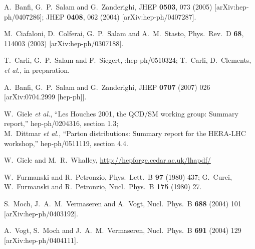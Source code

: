 \documentclass[12pt]{article}
\begin{document}
\begin{thebibliography}{99}
  A.~Banfi, G.~P.~Salam and G.~Zanderighi,
  JHEP {\bf 0503}, 073 (2005)
  [arXiv:hep-ph/0407286];
%
  JHEP {\bf 0408}, 062 (2004)
  [arXiv:hep-ph/0407287].

  M.~Ciafaloni, D.~Colferai, G.~P.~Salam and A.~M.~Stasto,
  Phys.\ Rev.\  D {\bf 68}, 114003 (2003)
  [arXiv:hep-ph/0307188].


  T.~Carli, G.~P.~Salam and F.~Siegert,
  :hep-ph/0510324;
  T.~Carli, D.~Clements, {\it et al.}, in preparation.

  A.~Banfi, G.~P.~Salam and G.~Zanderighi,
  JHEP {\bf 0707} (2007) 026
  [arXiv:0704.2999 [hep-ph]].


  W.~Giele {\it et al.},
  ``Les Houches 2001, the QCD/SM working group: Summary report,''
  hep-ph/0204316, section 1.3;\\
  M.~Dittmar {\it et al.},
  ``Parton distributions: Summary report for the HERA-LHC workshop,''
  hep-ph/0511119, section 4.4.

 W.~Giele and M.~R.~Whalley,
\url{http://hepforge.cedar.ac.uk/lhapdf/}


  W.~Furmanski and R.~Petronzio,
  Phys.\ Lett.\  B {\bf 97} (1980) 437;
  G.~Curci, W.~Furmanski and R.~Petronzio,
  Nucl.\ Phys.\  B {\bf 175} (1980) 27.


  S.~Moch, J.~A.~M.~Vermaseren and A.~Vogt,
  Nucl.\ Phys.\ B {\bf 688} (2004) 101
  [arXiv:hep-ph/0403192].

  A.~Vogt, S.~Moch and J.~A.~M.~Vermaseren,
  Nucl.\ Phys.\ B {\bf 691} (2004) 129
  [arXiv:hep-ph/0404111].


\end{thebibliography}
\end{document}
